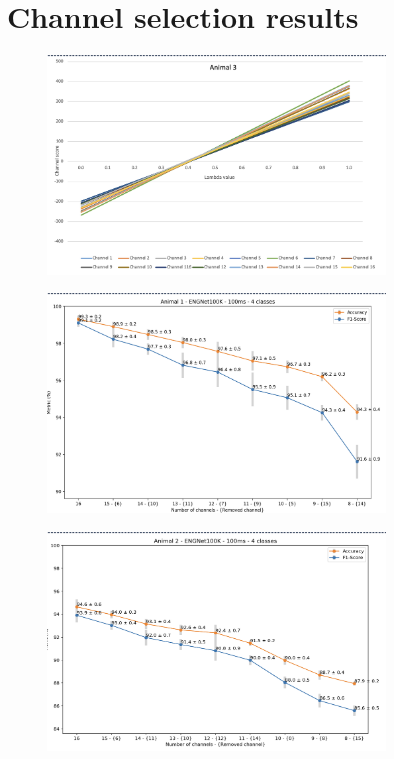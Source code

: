 \documentclass{Configuration_Files/PoliMi3i_thesis}
\begin{document}
\section{Channel selection results}


\begin{figure}[h!]
    \centering
    \includegraphics[width=0.8\textwidth]{Results Matteo/figure1}
    \label{fig:figure1}
\end{figure}

\begin{figure}[h!]
    \centering
    \includegraphics[width=0.8\textwidth]{Results Matteo/figure2}
    \label{fig:figure1}
\end{figure}

\begin{figure}[h!]
    \centering
    \includegraphics[width=0.8\textwidth]{Results Matteo/figure3}
    \label{fig:figure1}
\end{figure}
\end{document}
